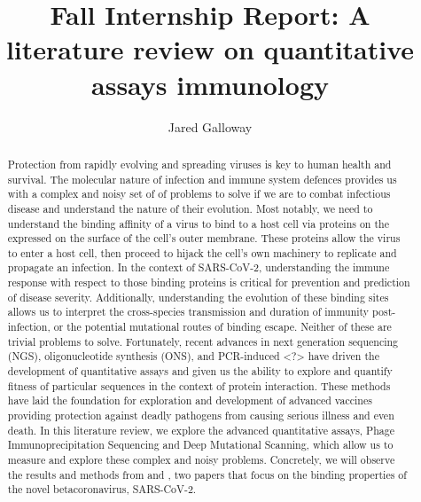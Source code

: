 \documentclass{article}
\title{Fall Internship Report: A literature review on quantitative assays immunology}
\author{Jared Galloway}
\begin{document}
\maketitle

\begin{abstract}
Protection from rapidly evolving and spreading viruses is key to human health and survival.
The molecular nature of infection and immune system defences provides us with a complex and noisy set of of problems to solve
if we are to combat infectious disease and understand the nature of their evolution.
Most notably, we need to understand the binding affinity of a virus to bind to a host cell via proteins on the expressed on the surface of the cell's outer membrane.
These proteins allow the virus to enter a host cell, then proceed to hijack the cell's own machinery to replicate and propagate an infection.
In the context of SARS-CoV-2, understanding the immune response with respect to those binding proteins is critical
for prevention and prediction of disease severity.
Additionally, understanding the evolution of these binding sites allows us to interpret the cross-species transmission
and duration of immunity post-infection, or the potential mutational routes of binding escape.
Neither of these are trivial problems to solve. 
Fortunately, recent advances in next generation sequencing (NGS), oligonucleotide synthesis (ONS), and PCR-induced <?>
have driven the development of quantitative assays and given us the ability to explore and quantify fitness of particular sequences in the context of protein interaction.
These methods have laid the foundation for exploration and development of advanced vaccines providing protection against deadly pathogens
from causing serious illness and even death.
In this literature review, we explore the advanced quantitative assays, Phage Immunoprecipitation Sequencing
and Deep Mutational Scanning, which allow us to measure and explore these complex and noisy problems.
Concretely, we will observe the results and methods from \citet{Shrock2020} and \citet{Starr2020}, two papers that focus on the binding properties of the novel betacoronavirus, SARS-CoV-2.
\end{abstract}
\end{document}
